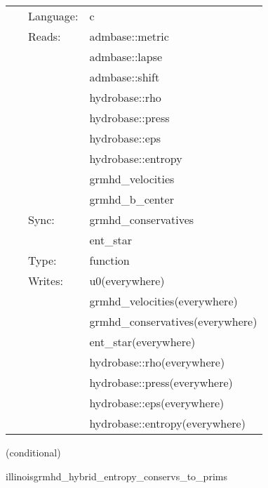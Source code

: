  \begin{tabular*}{160mm}{cll} 
~ & Language:  & c \\ 
~ & Reads:  & admbase::metric \\ 
~& ~ &admbase::lapse\\ 
~& ~ &admbase::shift\\ 
~& ~ &hydrobase::rho\\ 
~& ~ &hydrobase::press\\ 
~& ~ &hydrobase::eps\\ 
~& ~ &hydrobase::entropy\\ 
~& ~ &grmhd\_velocities\\ 
~& ~ &grmhd\_b\_center\\ 
~ & Sync:  & grmhd\_conservatives \\ 
~& ~ &ent\_star\\ 
~ & Type:  & function \\ 
~ & Writes:  & u0(everywhere) \\ 
~& ~ &grmhd\_velocities(everywhere)\\ 
~& ~ &grmhd\_conservatives(everywhere)\\ 
~& ~ &ent\_star(everywhere)\\ 
~& ~ &hydrobase::rho(everywhere)\\ 
~& ~ &hydrobase::press(everywhere)\\ 
~& ~ &hydrobase::eps(everywhere)\\ 
~& ~ &hydrobase::entropy(everywhere)\\ 
\end{tabular*} 


\vspace{5mm}

   (conditional) 

\hspace{5mm} illinoisgrmhd\_hybrid\_entropy\_conservs\_to\_prims 

\hspace{5mm}{\it entropy+hybrid version of illinoisgrmhd\_conservs\_to\_prims } 


\hspace{5mm}

